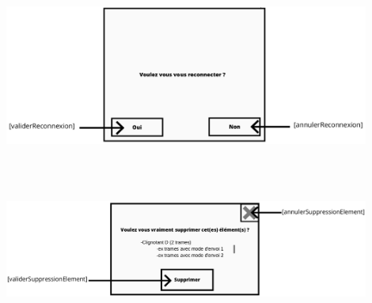 \begin{minipage}{1\linewidth}
    \centering
    \includegraphics[width=0.9\textwidth]{sections/3_Exigences_specifiques/1_IHM/ihm/popUpReconnexion.png}
    \label{ecran_demande_reconnexion}
\end{minipage}\\ \\

\begin{minipage}{1\linewidth}
    \centering
    \includegraphics[width=0.9\textwidth]{sections/3_Exigences_specifiques/1_IHM/ihm/popUpSuppressionElementObjet.png}
    \label{ecran_suppression_element}
\end{minipage}\\